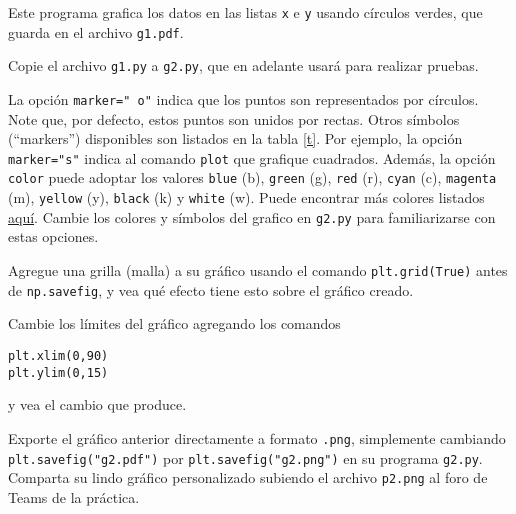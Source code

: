 \documentclass[11pt]{exam}
\begin{document}
\begin{questions}
Este programa grafica los datos en las listas \texttt{x} e \texttt{y} usando círculos verdes, que guarda en el archivo \texttt{g1.pdf}.
\item Copie el archivo \texttt{g1.py} a \texttt{g2.py}, que en adelante usará para realizar pruebas. 
\item La opción \texttt{marker="\,o"} indica que los puntos son representados por círculos. Note que, por defecto, estos puntos son unidos por rectas. Otros símbolos (``markers'') disponibles son listados en la tabla \ref{t}. Por ejemplo, la opción \texttt{marker="s"} indica al comando \texttt{plot} que grafique cuadrados. 
Además, la opción \texttt{color} puede adoptar los valores \texttt{blue} (b), \texttt{green} (g), \texttt{red} (r), \texttt{cyan} (c), \texttt{magenta} (m), \texttt{yellow} (y), \texttt{black} (k) y \texttt{white} (w). Puede encontrar más colores listados \href{http://matplotlib.org/examples/color/named_colors.html}{aquí}. Cambie los colores y símbolos del grafico en \texttt{g2.py} para familiarizarse con estas opciones.

\item Agregue una grilla (malla) a su gráfico usando el comando \texttt{plt.grid(True)} antes de \texttt{np.savefig}, y vea qué efecto tiene esto sobre el gráfico creado.
\item Cambie los límites del gráfico agregando los comandos

\begin{verbatim}
plt.xlim(0,90)
plt.ylim(0,15)
\end{verbatim}
y vea el cambio que produce.


\item Exporte el gráfico anterior directamente a formato \texttt{.png}, simplemente cambiando \newline \texttt{plt.savefig("g2.pdf")} por \texttt{plt.savefig("g2.png")} en su programa \texttt{g2.py}. Comparta su lindo gráfico personalizado subiendo el archivo \texttt{p2.png} al foro de Teams de la práctica.


\end{questions}
\end{document}

